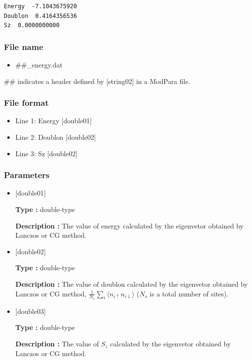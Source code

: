 \begin{minipage}{12.5cm}
\begin{screen}
\begin{verbatim}
Energy  -7.1043675920 
Doublon  0.4164356536 
Sz  0.0000000000 
\end{verbatim}
\end{screen}
\end{minipage}

\subsubsection{File name}
 \begin{itemize}
   \item  \#\#\_energy.dat
 \end{itemize}
 \#\# indicates a header defined by [string02] in a ModPara file.

\subsubsection{File format}
 \begin{itemize}
   \item Line 1: Energy $[$double01$]$
   \item Line 2: Doublon $[$double02$]$
   \item Line 3: Sz $[$double02$]$
  \end{itemize}
\subsubsection{Parameters}
 \begin{itemize}

  \item  $[$double01$]$
  
 {\bf Type :} double-type

{\bf Description :} The value of energy calculated by the eigenvetor obtained by Lanczos or CG method.
 
  \item  $[$double02$]$

 {\bf Type :} double-type 

{\bf Description :}  The value of doublon calculated by the eigenvetor obtained by Lanczos or CG method,
$\frac{1}{N_s} \sum_{i}\langle n_{i\uparrow}n_{i\downarrow}\rangle$ ($N_s$ is a total number of sites).

  \item  $[$double03$]$

 {\bf Type :} double-type 

{\bf Description :}  The value of $S_z$ calculated by the eigenvetor obtained by Lanczos or CG method.

 \end{itemize}


